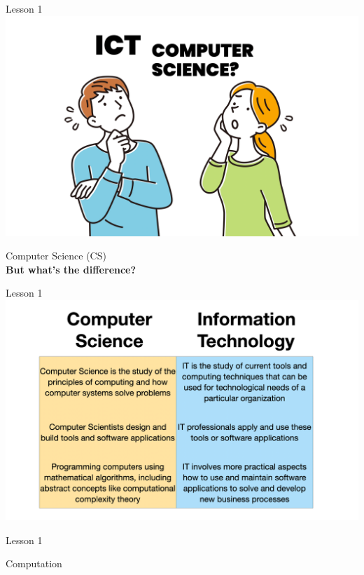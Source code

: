 \documentclass[aspectratio=1610]{beamer}
\begin{document}
\begin{frame}{Lesson 1}{}
\includegraphics[scale=0.149]{Images/ictvscs.png}
\end{frame}


\begin{frame}
\begin{center}
\Huge Computer Science (CS)\\
\textbf { But what's the difference? }
\end{center}
\end{frame}


\begin{frame}{Lesson 1}{}
\includegraphics[scale=0.158]{Images/itvscs_10.png}
\end{frame}

\begin{frame}{Lesson 1}{}
\begin{center}
\Huge Computation
\end{center}
\end{frame}
\end{document}
